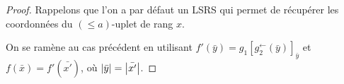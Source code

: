 \documentclass{report}
\newcommand{\eqpredf}[4]{#1\left[ #2^{\leftarrow}(#3) \right]_{#4}} %
\newcommand{\leqa}{\left( \leqslant a \right)}
\begin{document}
\begin{proof}
		Rappelons que l'on a par défaut un LSRS qui permet de récupérer les coordonnées du $\leqa$-uplet de rang $x$.
		
		
		
		
		On se ramène au cas précédent en utilisant $f'\left( \bar{y} \right) = \eqpredf{g_1}{g_2}{\bar{y}}{\bar{y}}$ et $f\left( \bar{x} \right) = f'\left( \bar{x'} \right)$, où $\left|\bar{y}\right| = \left|\bar{x'}\right|$.
		
	\end{proof}
	
	
	
	
	
	
	
	
	
	
	
	
	
	
	
	
	
\end{document}
